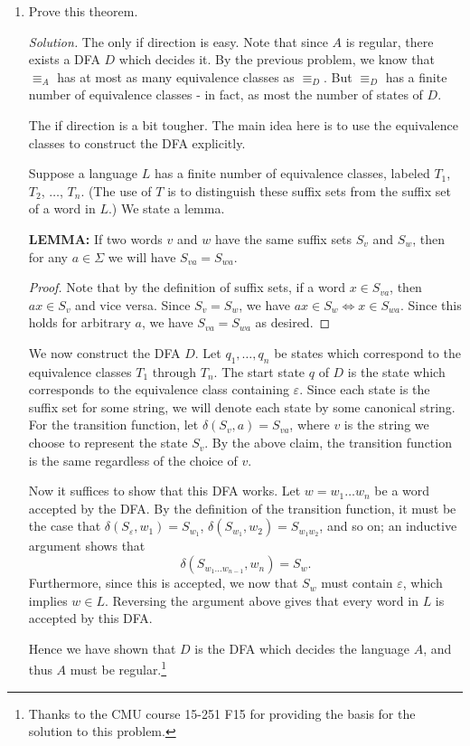 \documentclass[11pt]{article}
\newcounter{enum}
\newcommand{\solution}
{
\vspace{5pt}
\noindent\textit{Solution.}\qquad
}
\begin{document}
\begin{enumerate}

\item Prove this theorem.

\solution The only if direction is easy.  Note that since $A$ is regular, there exists a DFA $D$ which decides it.  By the previous problem, we know that $\equiv_A$ has at most as many equivalence classes as $\equiv_D$.  But $\equiv_D$ has a finite number of equivalence classes - in fact, as most the number of states of $D$.

\par The if direction is a bit tougher.  The main idea here is to use the equivalence classes to construct the DFA explicitly.

\par Suppose a language $L$ has a finite number of equivalence classes, labeled $T_1$, $T_2$, $\ldots$, $T_n$.  (The use of $T$ is to distinguish these suffix sets from the suffix set of a word in $L$.)  We state a lemma.

\par\textbf{LEMMA: }If two words $v$ and $w$ have the same suffix sets $S_v$ and $S_w$, then for any $a\in\Sigma$ we will have $S_{va}=S_{wa}$.

\begin{proof}
Note that by the definition of suffix sets, if a word $x\in S_{va}$, then $ax\in S_v$ and vice versa.  Since $S_v=S_w$, we have $ax\in S_w\iff x\in S_{wa}$.  Since this holds for arbitrary $a$, we have $S_{va}=S_{wa}$ as desired.
\end{proof}

We now construct the DFA $D$.  Let $q_1,\ldots, q_n$ be states which correspond to the equivalence classes $T_1$ through $T_n$.  The start state $q$ of $D$ is the state which corresponds to the equivalence class containing $\varepsilon$.  Since each state is the suffix set for some string, we will denote each state by some canonical string.  For the transition function, let $\delta(S_v,a)=S_{va}$, where $v$ is the string we choose to represent the state $S_v$.  By the above claim, the transition function is the same regardless of the choice of $v$.

\par Now it suffices to show that this DFA works.  Let $w=w_1\ldots w_n$ be a word accepted by the DFA.  By the definition of the transition function, it must be the case that $\delta(S_\varepsilon,w_1)=S_{w_1}$, $\delta(S_{w_1},w_2)=S_{w_1w_2}$, and so on; an inductive argument shows that \[\delta(S_{w_1\ldots w_{n-1}},w_n) = S_w.\] Furthermore, since this is accepted, we now that $S_w$ must contain $\varepsilon$, which implies $w\in L$.  Reversing the argument above gives that every word in $L$ is accepted by this DFA.

\par Hence we have shown that $D$ is the DFA which decides the language $A$, and thus $A$ must be regular.\footnote{Thanks to the CMU course 15-251 F15 for providing the basis for the solution to this problem.} 

\end{enumerate}
\end{document}
